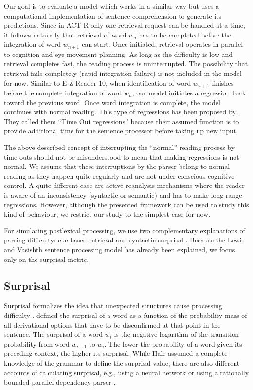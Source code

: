 Our goal is to evaluate a model which works in a similar way but uses a computational implementation of sentence comprehension to generate its predictions. 
Since in ACT-R only one retrieval request can be handled at a time, it follows naturally that retrieval of word $w_{n}$ has to be completed before the integration of word $w_{n+1}$ can start.  Once initiated, retrieval operates in parallel to cognition and eye movement planning. As long as the difficulty is low and retrieval completes fast, the reading process is uninterrupted.  The possibility that retrieval fails completely (rapid integration failure) is not included in the model for now.
Similar to E-Z Reader 10, when identification of word $w_{n+1}$ finishes before the complete integration of word $w_n$, our model initiates a regression back toward the previous word.  Once word integration is complete, the model continues with normal reading.  This type of regressions has been proposed by \cite{MitchellEtAl2008}.  They called them  ``Time Out regressions'' because their assumed function is to provide additional time for the sentence processor before taking up new input.

The above described concept of interrupting the ``normal'' reading process by time outs should not be misunderstood to mean that making regressions is not normal.  We assume that these interruptions by the parser belong to normal reading as they happen quite regularly and are not under conscious cognitive control.  A quite different case are active reanalysis mechanisms where the reader is aware of an inconsistency (syntactic or semantic) and has to make long-range regressions.  However, although the presented framework can be used to study this kind of behaviour, we restrict our study to the simplest case for now.

For simulating postlexical processing, we use two complementary explanations of parsing difficulty: cue-based retrieval \citep{LewisVasishth2005} and  syntactic surprisal \citep{Hale2001,Levy2008}. Because the Lewis and Vasishth sentence processing model has already been explained, we focus only on the surprisal metric. 

\subsection{Surprisal}
Surprisal \citep{Hale2001,Levy2008} formalizes the idea that unexpected structures cause processing difficulty \citep{Konieczny2000}. \cite{Hale2001} defined the surprisal of a word as a function of the probability mass of all derivational options that have to be disconfirmed at that point in the sentence.
The surprisal of a word $w_i$ is the negative logarithm of the transition probability from word $w_{i-1}$ to $w_i$. The lower the probability of a word given its preceding context, the higher its surprisal. While Hale assumed a complete knowledge of the grammar to define the surprisal value, there are also different accounts of calculating surprisal, e.g., using a neural network \citep{Frank2009} or using a rationally bounded parallel dependency parser \citep{BostonHaleVasishth2011}.

